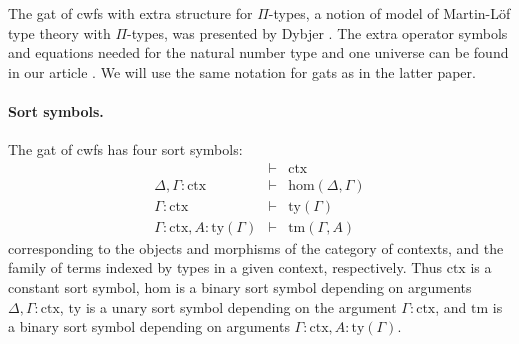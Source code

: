 \documentclass[submission,copyright,creativecommons]{eptcs}
\newcommand{\ERASER}[1]{}
\def\sub{\mathrm{hom}}
\newcommand{\ctx}{\mathrm{ctx}}
\newcommand{\ty}{\mathrm{ty}}
\newcommand{\tm}{\mathrm{tm}}
\begin{document}
The gat of cwfs with extra structure for $\Pi$-types, a notion of model of Martin-Löf type theory with $\Pi$-types, was presented by Dybjer \cite{dybjer:torino}. The extra operator symbols and equations needed for the natural number type and one universe can be found in our article \cite{bezem:hofmann}. We will use the same notation for gats as in the latter paper.

\ERASER{\todo[inline]{Add something about the general correspondence between gats and type theory: sort symbol = judgment form, operator symbol for formation, introduction, and elimination rules, equation for equality rules.}}

\paragraph{Sort symbols.}
The gat of cwfs has four sort symbols:
\begin{eqnarray*}
&\vdash& \ctx\\
\Delta, \Gamma : \ctx&\vdash& \sub(\Delta,\Gamma)\\
\Gamma : \ctx&\vdash& \ty(\Gamma)\\
\Gamma : \ctx, A : \ty(\Gamma)&\vdash& \tm(\Gamma,A)
\end{eqnarray*}
corresponding to the objects and morphisms of the category of contexts, and the family of terms indexed by types in a given context, respectively. Thus $\ctx$ is a constant sort symbol, $\sub$ is a binary sort symbol depending on arguments $\Delta, \Gamma : \ctx$, $\ty$ is a unary sort symbol depending on the argument $\Gamma : \ctx$, and $\tm$ is a binary sort symbol depending on arguments $\Gamma : \ctx, A : \ty(\Gamma)$.
\end{document}
